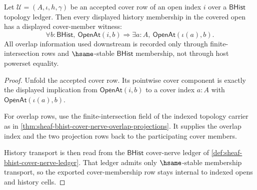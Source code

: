 \begin{theorem}
\label{thm:sheaf-root-unblock-cover-membership-obligation}
Let $\mathcal{U}=(A,\iota,h,\gamma)$ be an accepted cover row of an open index $i$ over a $\mathsf{BHist}$ topology ledger. Then every displayed history membership in the covered open has a displayed cover-member witness:
$$
\forall b:\mathsf{BHist},\
\mathsf{OpenAt}(i,b)
\Longrightarrow
\exists a:A,\ \mathsf{OpenAt}(\iota(a),b).
$$
All overlap information used downstream is recorded only through finite-intersection rows and $\hsame$-stable $\mathsf{BHist}$ membership, not through host powerset equality.
\end{theorem}
\begin{proof}
Unfold the accepted cover row. Its pointwise cover component is exactly the displayed implication from $\mathsf{OpenAt}(i,b)$ to a cover index $a:A$ with $\mathsf{OpenAt}(\iota(a),b)$.

For overlap rows, use the finite-intersection field of the indexed topology carrier as in \autoref{thm:sheaf-bhist-cover-nerve-overlap-projections}. It supplies the overlap index and the two projection rows back to the participating cover members.

History transport is then read from the $\mathsf{BHist}$ cover-nerve ledger of \autoref{def:sheaf-bhist-cover-nerve-ledger}. That ledger admits only $\hsame$-stable membership transport, so the exported cover-membership row stays internal to indexed opens and history cells.
\end{proof}

